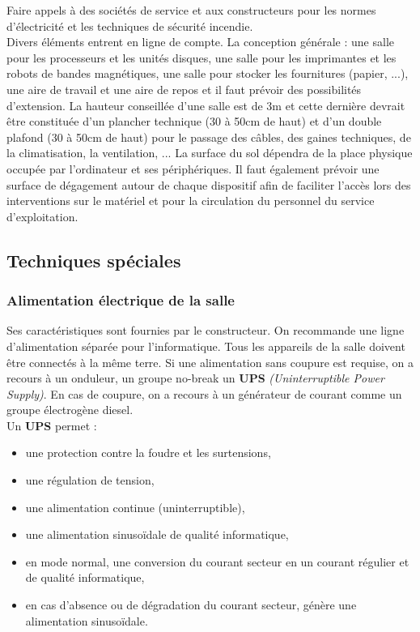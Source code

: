 \documentclass[10pt,a4paper,oneside,titlepage]{report}
\newcommand{\titre}[1]{\textcolor{title}{#1}}
\newcommand{\strong}[1]{\textbf{\titre{#1}}}
\begin{document}
Faire appels à des sociétés de service et aux constructeurs pour les normes
d'électricité et les techniques de sécurité incendie.\\
Divers éléments entrent en ligne de compte. La conception générale : une salle
pour les processeurs et les unités disques, une salle pour les imprimantes et
les robots de bandes magnétiques, une salle pour stocker les fournitures
(papier, ...), une aire de travail et une aire de repos et il faut prévoir des
possibilités d'extension. La hauteur conseillée d'une salle est de 3m et cette
dernière devrait être constituée d'un plancher technique (30 à 50cm de haut)
et d'un double plafond (30 à 50cm de haut) pour le passage des câbles, des
gaines techniques, de la climatisation, la ventilation, ... La surface du sol
dépendra de la place physique occupée par l'ordinateur et ses périphériques. Il
faut également prévoir une surface de dégagement autour de chaque dispositif
afin de faciliter l'accès lors des interventions sur le matériel et pour la
circulation du personnel du service d'exploitation.

\subsection{Techniques spéciales}

\subsubsection{Alimentation électrique de la salle}

Ses caractéristiques sont fournies par le constructeur. On recommande une ligne
d'alimentation séparée pour l'informatique. Tous les appareils de la salle
doivent être connectés à la même terre. Si une alimentation sans coupure est
requise, on a recours à un onduleur, un groupe no-break un \strong{UPS}
\textit{(Uninterruptible Power Supply)}. En cas de coupure, on a recours à un
générateur de courant comme un groupe électrogène diesel.\\

Un \textbf{UPS} permet :\begin{itemize}
\item une protection contre la foudre et les surtensions,
\item une régulation de tension,
\item une alimentation continue (uninterruptible),
\item une alimentation sinusoïdale de qualité informatique,
\item en mode normal, une conversion du courant secteur en un courant régulier
et de qualité informatique,
\item en cas d'absence ou de dégradation du courant secteur, génère une
alimentation sinusoïdale.
\end{itemize}
\end{document}
